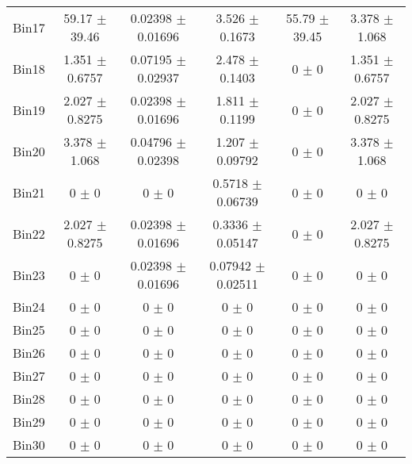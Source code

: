 \begin{tabular}{@{\extracolsep{4pt}}lccccc@{}}
     Bin17 & 59.17 $\pm$ 39.46 & 0.02398 $\pm$ 0.01696 & 3.526 $\pm$ 0.1673 & 55.79 $\pm$ 39.45 & 3.378 $\pm$ 1.068 \\ 
     Bin18 & 1.351 $\pm$ 0.6757 & 0.07195 $\pm$ 0.02937 & 2.478 $\pm$ 0.1403 & 0 $\pm$ 0 & 1.351 $\pm$ 0.6757 \\ 
     Bin19 & 2.027 $\pm$ 0.8275 & 0.02398 $\pm$ 0.01696 & 1.811 $\pm$ 0.1199 & 0 $\pm$ 0 & 2.027 $\pm$ 0.8275 \\ 
     Bin20 & 3.378 $\pm$ 1.068 & 0.04796 $\pm$ 0.02398 & 1.207 $\pm$ 0.09792 & 0 $\pm$ 0 & 3.378 $\pm$ 1.068 \\ 
     Bin21 & 0 $\pm$ 0 & 0 $\pm$ 0 & 0.5718 $\pm$ 0.06739 & 0 $\pm$ 0 & 0 $\pm$ 0 \\ 
     Bin22 & 2.027 $\pm$ 0.8275 & 0.02398 $\pm$ 0.01696 & 0.3336 $\pm$ 0.05147 & 0 $\pm$ 0 & 2.027 $\pm$ 0.8275 \\ 
     Bin23 & 0 $\pm$ 0 & 0.02398 $\pm$ 0.01696 & 0.07942 $\pm$ 0.02511 & 0 $\pm$ 0 & 0 $\pm$ 0 \\ 
     Bin24 & 0 $\pm$ 0 & 0 $\pm$ 0 & 0 $\pm$ 0 & 0 $\pm$ 0 & 0 $\pm$ 0 \\ 
     Bin25 & 0 $\pm$ 0 & 0 $\pm$ 0 & 0 $\pm$ 0 & 0 $\pm$ 0 & 0 $\pm$ 0 \\ 
     Bin26 & 0 $\pm$ 0 & 0 $\pm$ 0 & 0 $\pm$ 0 & 0 $\pm$ 0 & 0 $\pm$ 0 \\ 
     Bin27 & 0 $\pm$ 0 & 0 $\pm$ 0 & 0 $\pm$ 0 & 0 $\pm$ 0 & 0 $\pm$ 0 \\ 
     Bin28 & 0 $\pm$ 0 & 0 $\pm$ 0 & 0 $\pm$ 0 & 0 $\pm$ 0 & 0 $\pm$ 0 \\ 
     Bin29 & 0 $\pm$ 0 & 0 $\pm$ 0 & 0 $\pm$ 0 & 0 $\pm$ 0 & 0 $\pm$ 0 \\ 
     Bin30 & 0 $\pm$ 0 & 0 $\pm$ 0 & 0 $\pm$ 0 & 0 $\pm$ 0 & 0 $\pm$ 0 \\ 
\hline\hline
  \end{tabular}
